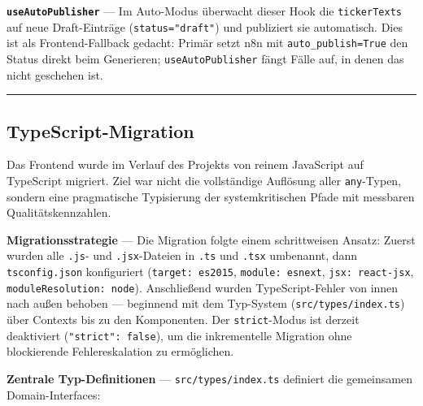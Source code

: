 \textbf{\texttt{useAutoPublisher}} --- Im Auto-Modus überwacht dieser
Hook die \texttt{tickerTexts} auf neue Draft-Einträge
(\texttt{status="draft"}) und publiziert sie automatisch. Dies ist als
Frontend-Fallback gedacht: Primär setzt n8n mit
\texttt{auto\_publish=True} den Status direkt beim Generieren;
\texttt{useAutoPublisher} fängt Fälle auf, in denen das nicht geschehen
ist.

\begin{center}\rule{0.5\linewidth}{0.5pt}\end{center}

\subsection{TypeScript-Migration}\label{typescript-migration}

Das Frontend wurde im Verlauf des Projekts von reinem JavaScript auf
TypeScript migriert. Ziel war nicht die vollständige Auflösung aller
\texttt{any}-Typen, sondern eine pragmatische Typisierung der
systemkritischen Pfade mit messbaren Qualitätskennzahlen.

\textbf{Migrationsstrategie} --- Die Migration folgte einem
schrittweisen Ansatz: Zuerst wurden alle \texttt{.js}- und
\texttt{.jsx}-Dateien in \texttt{.ts} und \texttt{.tsx} umbenannt, dann
\texttt{tsconfig.json} konfiguriert (\texttt{target:\ es2015},
\texttt{module:\ esnext}, \texttt{jsx:\ react-jsx},
\texttt{moduleResolution:\ node}). Anschließend wurden TypeScript-Fehler
von innen nach außen behoben --- beginnend mit dem Typ-System
(\texttt{src/types/index.ts}) über Contexts bis zu den Komponenten. Der
\texttt{strict}-Modus ist derzeit deaktiviert
(\texttt{"strict":\ false}), um die inkrementelle Migration ohne
blockierende Fehlereskalation zu ermöglichen.

\textbf{Zentrale Typ-Definitionen} --- \texttt{src/types/index.ts}
definiert die gemeinsamen Domain-Interfaces:

